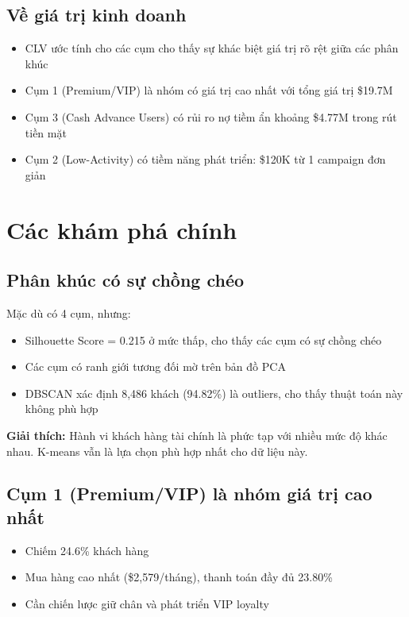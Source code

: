 \subsection{Về giá trị kinh doanh}

\begin{itemize}
    \item CLV ước tính cho các cụm cho thấy sự khác biệt giá trị rõ rệt giữa các phân khúc
    \item Cụm 1 (Premium/VIP) là nhóm có giá trị cao nhất với tổng giá trị \$19.7M
    \item Cụm 3 (Cash Advance Users) có rủi ro nợ tiềm ẩn khoảng \$4.77M trong rút tiền mặt
    \item Cụm 2 (Low-Activity) có tiềm năng phát triển: \$120K từ 1 campaign đơn giản
\end{itemize}

\section{Các khám phá chính}

\subsection{Phân khúc có sự chồng chéo}

Mặc dù có 4 cụm, nhưng:
\begin{itemize}
    \item Silhouette Score = 0.215 ở mức thấp, cho thấy các cụm có sự chồng chéo
    \item Các cụm có ranh giới tương đối mờ trên bản đồ PCA
    \item DBSCAN xác định 8,486 khách (94.82\%) là outliers, cho thấy thuật toán này không phù hợp
\end{itemize}

\textbf{Giải thích:} Hành vi khách hàng tài chính là phức tạp với nhiều mức độ khác nhau. K-means vẫn là lựa chọn phù hợp nhất cho dữ liệu này.

\subsection{Cụm 1 (Premium/VIP) là nhóm giá trị cao nhất}

\begin{itemize}
    \item Chiếm 24.6\% khách hàng
    \item Mua hàng cao nhất (\$2,579/tháng), thanh toán đầy đủ 23.80\%
    \item Cần chiến lược giữ chân và phát triển VIP loyalty
\end{itemize}

